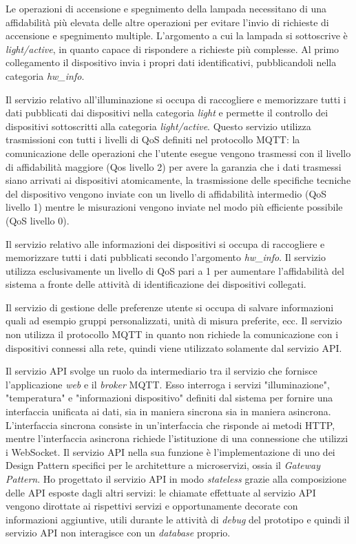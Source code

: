 Le operazioni di accensione e spegnimento della lampada necessitano di una affidabilità più elevata delle altre operazioni per evitare l'invio di richieste di accensione e spegnimento multiple.
L'argomento a cui la lampada si sottoscrive è \emph{light/active}, in quanto capace di rispondere a richieste più complesse. Al primo collegamento il dispositivo invia i propri dati identificativi, pubblicandoli nella categoria \emph{hw\_info}.


Il servizio relativo all'illuminazione si occupa di raccogliere e memorizzare tutti i dati pubblicati dai dispositivi nella categoria \emph{light} e permette il controllo dei dispositivi sottoscritti alla categoria \emph{light/active}.
Questo servizio utilizza trasmissioni con tutti i livelli di QoS definiti nel protocollo MQTT: la comunicazione delle operazioni che l'utente esegue vengono trasmessi con il livello di affidabilità maggiore (Qos livello 2) per avere la garanzia che i dati trasmessi siano arrivati ai dispositivi atomicamente, la trasmissione delle specifiche tecniche del dispositivo vengono inviate con un livello di affidabilità intermedio (QoS livello 1) mentre le misurazioni vengono inviate nel modo più efficiente possibile (QoS livello 0).

Il servizio relativo alle informazioni dei dispositivi si occupa di raccogliere e memorizzare tutti i dati pubblicati secondo l'argomento \emph{hw\_info}.
Il servizio utilizza esclusivamente un livello di QoS pari a 1 per aumentare l'affidabilità del sistema a fronte delle attività di identificazione dei dispositivi collegati.


Il servizio di gestione delle preferenze utente si occupa di salvare informazioni quali ad esempio gruppi personalizzati, unità di misura preferite, ecc.
Il servizio non utilizza il protocollo MQTT in quanto non richiede la comunicazione con i dispositivi connessi alla rete, quindi viene utilizzato solamente dal servizio API.


Il servizio API svolge un ruolo da intermediario tra il servizio che fornisce l'applicazione \emph{web} e il \emph{broker} MQTT.
Esso interroga i servizi "illuminazione", "temperatura" e "informazioni dispositivo"  definiti dal sistema per fornire una interfaccia unificata ai dati, sia in maniera sincrona sia in maniera asincrona.
L'interfaccia sincrona consiste in un'interfaccia che risponde ai metodi HTTP, mentre l'interfaccia asincrona richiede l'istituzione di una connessione che utilizzi i \gls{WebSocket}.
Il servizio API nella sua funzione è l'implementazione di uno dei Design Pattern specifici per le architetture a microservizi, ossia il \emph{Gateway Pattern}.
Ho progettato il servizio API in modo \emph{stateless} grazie alla composizione delle API esposte dagli altri servizi: le chiamate effettuate al servizio API vengono dirottate ai rispettivi servizi e opportunamente decorate con informazioni aggiuntive, utili durante le attività di \emph{debug} del prototipo e quindi il servizio API non interagisce con un \emph{database} proprio.

